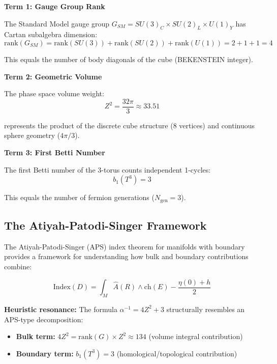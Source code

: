\documentclass[12pt,a4paper]{article}
\newcommand{\Zsq}{Z^2}
\newcommand{\Ngen}{N_{\text{gen}}}
\begin{document}
\textbf{Term 1: Gauge Group Rank}

The Standard Model gauge group $G_{SM} = SU(3)_C \times SU(2)_L \times U(1)_Y$ has Cartan subalgebra dimension:
\begin{equation}
\text{rank}(G_{SM}) = \text{rank}(SU(3)) + \text{rank}(SU(2)) + \text{rank}(U(1)) = 2 + 1 + 1 = 4
\end{equation}

This equals the number of body diagonals of the cube (BEKENSTEIN integer).

\textbf{Term 2: Geometric Volume}

The phase space volume weight:
\begin{equation}
\Zsq = \frac{32\pi}{3} \approx 33.51
\end{equation}

represents the product of the discrete cube structure (8 vertices) and continuous sphere geometry ($4\pi/3$).

\textbf{Term 3: First Betti Number}

The first Betti number of the 3-torus counts independent 1-cycles:
\begin{equation}
b_1(T^3) = 3
\end{equation}

This equals the number of fermion generations ($\Ngen = 3$).

\subsection{The Atiyah-Patodi-Singer Framework}

The Atiyah-Patodi-Singer (APS) index theorem for manifolds with boundary provides a framework for understanding how bulk and boundary contributions combine:

\begin{equation}
\text{Index}(D) = \int_M \hat{A}(R) \wedge \text{ch}(E) - \frac{\eta(0) + h}{2}
\end{equation}

\textbf{Heuristic resonance:} The formula $\alpha^{-1} = 4\Zsq + 3$ structurally resembles an APS-type decomposition:
\begin{itemize}
    \item \textbf{Bulk term:} $4\Zsq = \text{rank}(G) \times \Zsq \approx 134$ (volume integral contribution)
    \item \textbf{Boundary term:} $b_1(T^3) = 3$ (homological/topological contribution)
\end{itemize}
\end{document}
